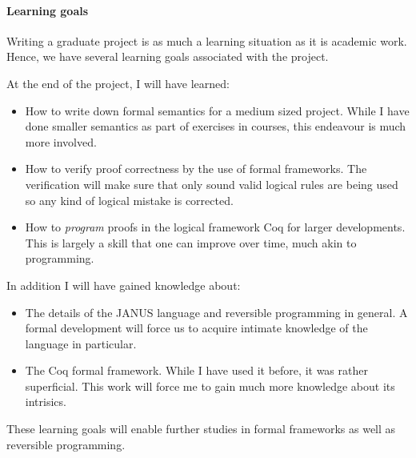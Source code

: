 \documentclass[a4paper, oneside, 10pt]{memoir}
\begin{document}
\paragraph{Learning goals}

Writing a graduate project is as much a learning situation as it is
academic work. Hence, we have several learning goals associated with
the project.

At the end of the project, I will have learned:
\begin{itemize}
\item How to write down formal semantics for a medium sized
  project. While I have done smaller semantics as part of exercises in
  courses, this endeavour is much more involved.
\item How to verify proof correctness by the use of formal
  frameworks. The verification will make sure that only sound valid
  logical rules are being used so any kind of logical mistake is
  corrected.
\item How to \emph{program} proofs in the logical framework Coq for
  larger developments. This is largely a skill that one can improve
  over time, much akin to programming.
\end{itemize}
In addition I will have gained knowledge about:
\begin{itemize}
\item The details of the JANUS language and reversible programming in
  general. A formal development will force us to acquire intimate
  knowledge of the language in particular.
\item The Coq formal framework. While I have used it before, it was
  rather superficial. This work will force me to gain much more
  knowledge about its intrisics.
\end{itemize}

These learning goals will enable further studies in formal frameworks
as well as reversible programming.

 
\end{document}
